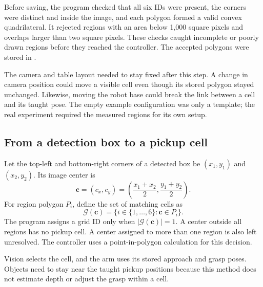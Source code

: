 Before saving, the program checked that all six IDs were present, the corners were distinct and inside the image, and each polygon formed a valid convex quadrilateral. It rejected regions with an area below 1,000 square pixels and overlaps larger than two square pixels. These checks caught incomplete or poorly drawn regions before they reached the controller. The accepted polygons were stored in .

The camera and table layout needed to stay fixed after this step. A change in camera position could move a visible cell even though its stored polygon stayed unchanged. Likewise, moving the robot base could break the link between a cell and its taught pose. The empty example configuration was only a template; the real experiment required the measured regions for its own setup.

\subsection{From a detection box to a pickup cell}

Let the top-left and bottom-right corners of a detected box be $(x_1,y_1)$ and $(x_2,y_2)$. Its image center is
\begin{equation}
    \mathbf{c}=(c_x,c_y)
    =\left(\frac{x_1+x_2}{2},\frac{y_1+y_2}{2}\right).
\end{equation}
For region polygon $P_i$, define the set of matching cells as
\begin{equation}
    \mathcal{G}(\mathbf{c})=\{i\in\{1,\ldots,6\}:\mathbf{c}\in P_i\}.
\end{equation}
The program assigns a grid ID only when $|\mathcal{G}(\mathbf{c})|=1$. A center outside all regions has no pickup cell. A center assigned to more than one region is also left unresolved. The controller uses a point-in-polygon calculation for this decision.

Vision selects the cell, and the arm uses its stored approach and grasp poses. Objects need to stay near the taught pickup positions because this method does not estimate depth or adjust the grasp within a cell.

